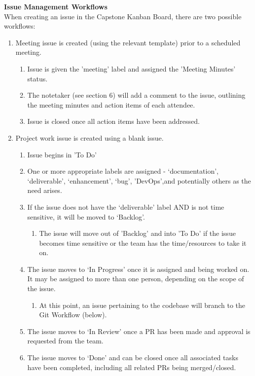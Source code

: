 \documentclass{article}
\begin{document}
\textbf{Issue Management Workflows}\\
When creating an issue in the Capstone Kanban Board, there are two possible workflows:
\begin{enumerate}
  \item Meeting issue is created (using the relevant template) prior to a scheduled meeting.  
  \begin{enumerate}
    \item Issue is given the 'meeting' label and assigned the 'Meeting Minutes' status.
    \item The notetaker (see section 6) will add a comment to the issue, outlining the meeting minutes and action items of each attendee.
    \item Issue is closed once all action items have been addressed.
  \end{enumerate}
  \item Project work issue is created using a blank issue.
  \begin{enumerate}
    \item Issue begins in 'To Do'
    \item One or more appropriate labels are assigned - ‘documentation’, ‘deliverable’, ‘enhancement’, ‘bug’, 'DevOps',and potentially others as the need arises.
    \item If the issue does not have the ‘deliverable’ label AND is not time sensitive, it will be moved to ‘Backlog’.
    \begin{enumerate}
      \item The issue will move out of 'Backlog' and into 'To Do' if the issue becomes time sensitive or the team has the time/resources to take it on.
    \end{enumerate}
    \item The issue moves to ‘In Progress’ once it is assigned and being worked on. It may be assigned to more than one person, depending on the scope of the issue.
    \begin{enumerate}
      \item At this point, an issue pertaining to the codebase will branch to the Git Workflow (below).
    \end{enumerate}
    \item The issue moves to ‘In Review’ once a PR has been made and approval is requested from the team.
    \item The issue moves to ‘Done’ and can be closed once all associated tasks have been completed, including all related PRs being merged/closed.
  \end{enumerate}
\end{enumerate}
\end{document}
